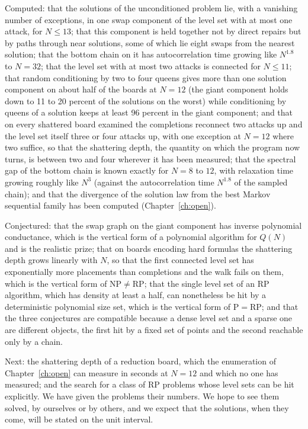 \documentclass[11pt,twoside,openany]{book}
\theoremstyle{plain}
\theoremstyle{definition}
\theoremstyle{remark}
\newcommand{\RP}{\mathrm{RP}}
\newcommand{\NP}{\mathrm{NP}}
\newcommand{\Pc}{\mathrm{P}}
\begin{document}
Computed: that the solutions of the unconditioned problem lie, with a vanishing number of exceptions, in one swap component of the level set with at most one attack, for $N \le 13$; that this component is held together not by direct repairs but by paths through near solutions, some of which lie eight swaps from the nearest solution; that the bottom chain on it has autocorrelation time growing like $N^{1.8}$ to $N = 32$; that the level set with at most two attacks is connected for $N \le 11$; that random conditioning by two to four queens gives more than one solution component on about half of the boards at $N = 12$ (the giant component holds down to 11 to 20 percent of the solutions on the worst) while conditioning by queens of a solution keeps at least 96 percent in the giant component; and that on every shattered board examined the completions reconnect two attacks up and the level set itself three or four attacks up, with one exception at $N = 12$ where two suffice, so that the shattering depth, the quantity on which the program now turns, is between two and four wherever it has been measured; that the spectral gap of the bottom chain is known exactly for $N = 8$ to $12$, with relaxation time growing roughly like $N^3$ (against the autocorrelation time $N^{1.8}$ of the sampled chain); and that the divergence of the solution law from the best Markov sequential family has been computed (Chapter~\ref{ch:open}).

Conjectured: that the swap graph on the giant component has inverse polynomial conductance, which is the vertical form of a polynomial algorithm for $Q(N)$ and is the realistic prize; that on boards encoding hard formulas the shattering depth grows linearly with $N$, so that the first connected level set has exponentially more placements than completions and the walk fails on them, which is the vertical form of $\NP \neq \RP$; that the single level set of an $\RP$ algorithm, which has density at least a half, can nonetheless be hit by a deterministic polynomial size set, which is the vertical form of $\Pc = \RP$; and that the three conjectures are compatible because a dense level set and a sparse one are different objects, the first hit by a fixed set of points and the second reachable only by a chain.

Next: the shattering depth of a reduction board, which the enumeration of Chapter~\ref{ch:open} can measure in seconds at $N = 12$ and which no one has measured; and the search for a class of $\RP$ problems whose level sets can be hit explicitly. We have given the problems their numbers. We hope to see them solved, by ourselves or by others, and we expect that the solutions, when they come, will be stated on the unit interval.
\end{document}

